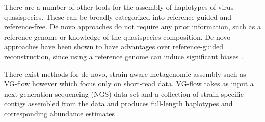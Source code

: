 \documentclass[11pt]{article}
\begin{document}
There are a number of other tools for the assembly of haplotypes of virus
quasispecies.
These can be broadly categorized into reference-guided and reference-free.
De novo approaches do not require any prior information, such as a reference
genome or knowledge of the quasispecies composition. De novo approaches have
been shown to have advantages over reference-guided reconstruction, since using
a reference genome can induce significant biases
\cite{baaijensStrainawareAssemblyGenomes2020}.

There exist methods for de novo, strain aware metagenomic assembly such as 
VG-flow \cite{baaijensStrainawareAssemblyGenomes2020} however which focus only on 
short-read data.
VG-flow takes as input a next-generation sequencing (NGS) data set and a 
collection of strain-specific contigs assembled from the data and produces 
full-length haplotypes and corresponding abundance estimates 
\cite{baaijensStrainawareAssemblyGenomes2020}.

\newpage


\end{document}
